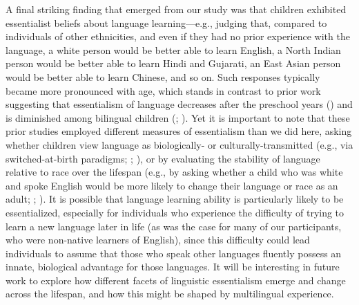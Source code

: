 \documentclass{foushee-adapted-preprint}
\begin{document}
A final striking finding that emerged from our study was that children exhibited essentialist beliefs about language learning---e.g., judging that, compared to individuals of other ethnicities, and even if they had no prior experience with the language, a white person would be better able to learn English, a North Indian person would be better able to learn Hindi and Gujarati, an East Asian person would be better able to learn Chinese, and so on. Such responses typically became more pronounced with age, which stands in contrast to prior work suggesting that essentialism of language decreases after the preschool years (\cite{kinzler2012children}) and is diminished among bilingual children (\cite{byers2015bilingualism}; \cite{dautel2018once}). Yet it is important to note that these prior studies employed different measures of essentialism than we did here, asking whether children view language as biologically- or culturally-transmitted (e.g., via switched-at-birth paradigms; \cite{hirschfeld1997young}; \cite{byers2015bilingualism}), or by evaluating the stability of language relative to race over the lifespan (e.g., by asking whether a child who was white and spoke English would be more likely to change their language or race as an adult; \cite{kinzler2012children}; \cite{dautel2018once}). It is possible that language learning ability is particularly likely to be essentialized, especially for individuals who experience the difficulty of trying to learn a new language later in life (as was the case for many of our participants, who were non-native learners of English), since this difficulty could lead individuals to assume that those who speak other languages fluently possess an innate, biological advantage for those languages. It will be interesting in future work to explore how different facets of linguistic essentialism emerge and change across the lifespan, and how this might be shaped by multilingual experience.

\end{document}
